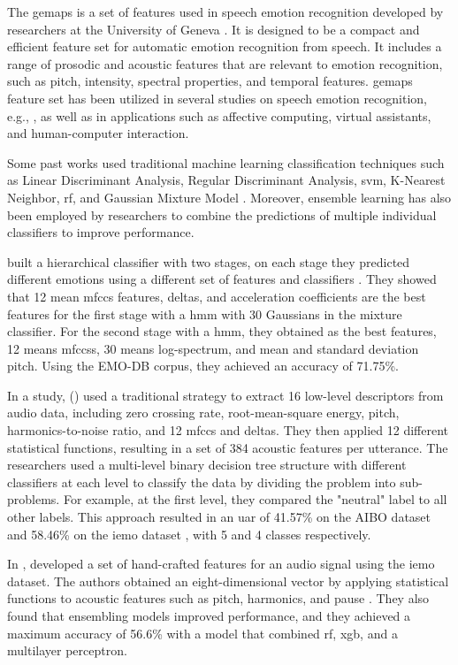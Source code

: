 The \ac{gemaps} is a set of features used in speech emotion recognition developed by researchers at the University of Geneva \cite{Eyben2016}. It is designed to be a compact and efficient feature set for automatic emotion recognition from speech. It includes a range of prosodic and acoustic features that are relevant to emotion recognition, such as pitch, intensity, spectral properties, and temporal features. \ac{gemaps} feature set has been utilized in several studies on speech emotion recognition, e.g., \cite{Tarantino2019}, as well as in applications such as affective computing, virtual assistants, and human-computer interaction.

Some past works used traditional machine learning classification techniques such as Linear Discriminant Analysis, Regular Discriminant Analysis, \ac{svm}, K-Nearest Neighbor, \ac{rf}, and Gaussian Mixture Model \cite{Kuchibhotla2014}. Moreover, ensemble learning has also been employed by researchers to combine the predictions of multiple individual classifiers to improve performance.

\citeauthor{Albornoz2011} built a hierarchical classifier with two stages, on each stage they predicted different emotions using a different set of features and classifiers \cite{Albornoz2011}. They showed that 12 mean \ac{mfccs} features, deltas, and acceleration coefficients are the best features for the first stage with a \ac{hmm} with 30 Gaussians in the mixture classifier. For the second stage with a \ac{hmm}, they obtained as the best features, 12 means \acp{mfccs}, 30 means log-spectrum, and mean and standard deviation pitch. Using the EMO-DB corpus, they achieved an accuracy of 71.75\%.

In a study, \citeauthor{Lee2011} (\citeyear{Lee2011}) used a traditional strategy to extract 16 low-level descriptors from audio data, including zero crossing rate, root-mean-square energy, pitch, harmonics-to-noise ratio, and 12 \ac{mfccs} and deltas. They then applied 12 different statistical functions, resulting in a set of 384 acoustic features per utterance. The researchers used a multi-level binary decision tree structure with different classifiers at each level to classify the data by dividing the problem into sub-problems. For example, at the first level, they compared the "neutral" label to all other labels. This approach resulted in an \ac{uar} of 41.57\% on the AIBO dataset and 58.46\% on the \ac{iemo} dataset \cite{Lee2011}, with 5 and 4 classes respectively.

In \citeyear{HandCraftedSahu}, \citeauthor{HandCraftedSahu} developed a set of hand-crafted features for an audio signal using the \ac{iemo} dataset. The authors obtained an eight-dimensional vector by applying statistical functions to acoustic features such as pitch, harmonics, and pause \cite{HandCraftedSahu}. They also found that ensembling models improved performance, and they achieved a maximum accuracy of 56.6\% with a model that combined \ac{rf}, \ac{xgb}, and a multilayer perceptron.

